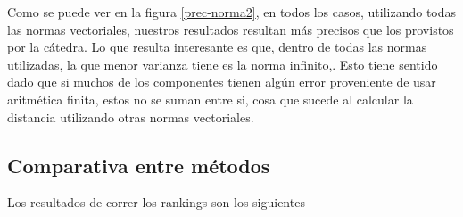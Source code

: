 \documentclass[a4paper]{article}
\begin{document}
Como se puede ver en la figura \ref{prec-norma2}, en todos los casos, utilizando todas las normas vectoriales, nuestros resultados resultan más precisos que los provistos por la cátedra. Lo que resulta interesante es que, dentro de todas las normas utilizadas, la que menor varianza tiene es la norma infinito,. Esto tiene sentido dado que si muchos de los componentes tienen algún error proveniente de usar aritmética finita, estos no se suman entre si, cosa que sucede al calcular la distancia utilizando otras normas vectoriales.

\subsection{Comparativa entre métodos}

Los resultados de correr los rankings son los siguientes
\end{document}
